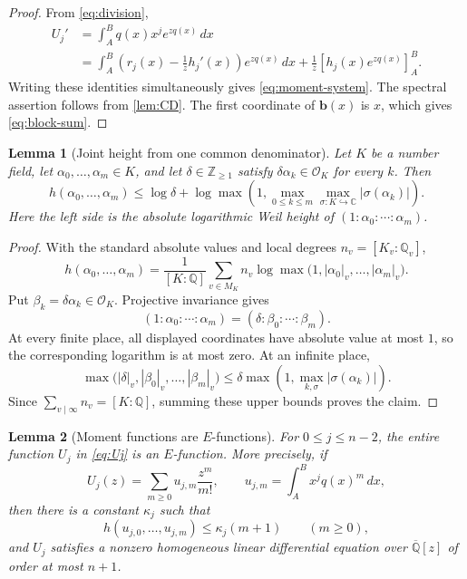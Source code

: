 \documentclass[11pt]{article}
\numberwithin{equation}{section}
\newtheorem{lemma}[lemma]{Lemma}
\theoremstyle{definition}
\theoremstyle{remark}
\newcommand{\C}{\mathbb C}
\newcommand{\Q}{\mathbb Q}
\newcommand{\Qbar}{\overline{\mathbb Q}}
\newcommand{\Z}{\mathbb Z}
\begin{document}
\begin{proof}
From \eqref{eq:division},
\begin{align*}
  U_j'
  &=\int_A^B q(x)x^j e^{zq(x)}\,dx\\
  &=\int_A^B\left(r_j(x)-\frac1z h_j'(x)\right)e^{zq(x)}\,dx
    +\frac1z\left[h_j(x)e^{zq(x)}\right]_{A}^{B}.
\end{align*}
Writing these identities simultaneously gives \eqref{eq:moment-system}.  The spectral assertion follows from \cref{lem:CD}.  The first coordinate of $\mathbf b(x)$ is $x$, which gives \eqref{eq:block-sum}.
\end{proof}


\begin{lemma}[Joint height from one common denominator]\label{lem:joint-height}
Let $K$ be a number field, let $\alpha_0,\ldots,\alpha_m\in K$, and let
$\delta\in\Z_{\ge1}$ satisfy $\delta\alpha_k\in\mathcal O_K$ for every
$k$.  Then
\[
  h(\alpha_0,\ldots,\alpha_m)
  \le \log\delta
  +\log\max\!\left(
    1,\max_{0\le k\le m}\max_{\sigma:K\hookrightarrow\C}
    |\sigma(\alpha_k)|
  \right).
\]
Here the left side is the absolute logarithmic Weil height of
$(1:\alpha_0:\cdots:\alpha_m)$.
\end{lemma}

\begin{proof}
With the standard absolute values and local degrees $n_v=[K_v:\Q_v]$,
\[
  h(\alpha_0,\ldots,\alpha_m)
  =\frac1{[K:\Q]}\sum_{v\in M_K}n_v
   \log\max\bigl(1,|\alpha_0|_v,\ldots,|\alpha_m|_v\bigr).
\]
Put $\beta_k=\delta\alpha_k\in\mathcal O_K$.  Projective invariance gives
\[
  (1:\alpha_0:\cdots:\alpha_m)
  =(\delta:\beta_0:\cdots:\beta_m).
\]
At every finite place, all displayed coordinates have absolute value at most
$1$, so the corresponding logarithm is at most zero.  At an infinite place,
\[
  \max\bigl(|\delta|_v,|\beta_0|_v,\ldots,|\beta_m|_v\bigr)
  \le
  \delta\max\!\left(
    1,\max_{k,\sigma}|\sigma(\alpha_k)|
  \right).
\]
Since $\sum_{v\mid\infty}n_v=[K:\Q]$, summing these upper bounds proves the
claim.
\end{proof}

\begin{lemma}[Moment functions are $E$-functions]\label{lem:E-functions}
For $0\le j\le n-2$, the entire function $U_j$ in \eqref{eq:Uj} is an
$E$-function.  More precisely, if
\[
  U_j(z)=\sum_{m\ge0}u_{j,m}\frac{z^m}{m!},
  \qquad
  u_{j,m}=\int_A^B x^j q(x)^m\,dx,
\]
then there is a constant $\kappa_j$ such that
\[
  h(u_{j,0},\ldots,u_{j,m})\le \kappa_j(m+1)
  \qquad(m\ge0),
\]
and $U_j$ satisfies a nonzero homogeneous linear differential equation over
$\Qbar[z]$ of order at most $n+1$.
\end{lemma}
\end{document}
